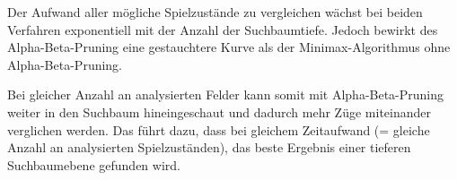 Der Aufwand aller m\"ogliche Spielzust\"ande zu vergleichen w\"achst bei beiden Verfahren exponentiell mit der Anzahl der Suchbaumtiefe.
Jedoch bewirkt des Alpha-Beta-Pruning eine gestauchtere Kurve als der Minimax-Algorithmus ohne Alpha-Beta-Pruning.

Bei gleicher Anzahl an analysierten Felder kann somit mit Alpha-Beta-Pruning weiter in den Suchbaum hineingeschaut und dadurch mehr Z\"uge miteinander verglichen werden.
Das f\"uhrt dazu, dass bei gleichem Zeitaufwand (= gleiche Anzahl an analysierten Spielzust\"anden), das beste Ergebnis einer tieferen Suchbaumebene gefunden wird.

\bigskip
\newpage